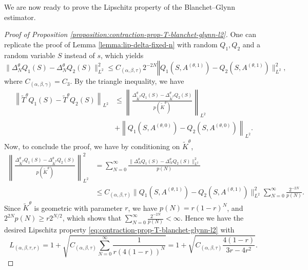 \documentclass[11pt]{article}
\numberwithin{equation}{section}
\theoremstyle{definition}
\theoremstyle{remark}
\begin{document}
We are now ready to prove the Lipschitz property of the Blanchet--Glynn estimator.

\begin{proof}[Proof of Proposition \ref{proposition:contraction-prop-T-blanchet-glynn-l2}]
   One can replicate the proof of Lemma \ref{lemma:lip-delta-fixed-n} with random $Q_1,Q_2$ and a random variable $S$ instead of $s$, which yields
    \[
        \| \Delta_N^\theta Q_1(S) - \Delta_N ^\theta Q_2(S) \|^2_{L^2} \leq C_{(\alpha, \beta, \tau)} 2^{-2N}\mathbb \|Q_1(S,A^{(\theta, 1)}) - Q_2(S, A^{(\theta, 1)})\|_{L^2}^2,
    \]
    where $C_{(\alpha,\beta,\gamma)} = C_3$.
    By the triangle inequality, we have
    \[
        \begin{aligned}
            \left\|\tilde{T}^\theta Q_1(S) - \tilde{T}^\theta Q_2(S) \right\|_{L^2} & \leq \left\|\frac{\Delta_{\tilde K^\theta}^\theta Q_1(S) - \Delta_{\tilde K ^ \theta} ^\theta Q_2(S)}{p(\tilde{K}^\theta)} \right\|_{L^2}   \\
            &+ \left\| Q_1(S,A^{(\theta, 0)}) - Q_2(S,A^{(\theta, 0)}) \right\|_{L^2}.
        \end{aligned}
    \]
    Now, to conclude the proof, we have by conditioning on $\tilde K^\theta$,
    \[
        \begin{aligned}
            \left\|\frac{\Delta_{\tilde K^\theta}^\theta Q_1(S) - \Delta_{\tilde K ^ \theta} ^\theta Q_2(S)}{p(\tilde{K}^\theta)} \right\|^2_{L^2} & = \sum_{N = 0}^{\infty} \frac{\| \Delta_N^\theta Q_1(S) - \Delta_N ^\theta Q_2(S) \|^2_{L^2}}{p(N)}                                   \\
            & \leq C_{(\alpha, \beta, \tau)} \|Q_1(S,A^{(\theta,1)}) - Q_2(S,A^{(\theta, 1)}) \|^2_{L^2} \sum_{N = 0}^{\infty} \frac{2^{-2N}}{p(N)}.
        \end{aligned}
    \]
    Since $\tilde K ^\theta$ is geometric with parameter $r$, we have
    $p(N) = r (1 - r)^{N}$, 
    and $2^{2N}p(N) \geq r 2^{N / 2}$, which shows that $\sum_{N = 0}^\infty \frac{2^{-2N}}{p(N)} < \infty$. Hence we have the desired Lipschitz property \eqref{eq:contraction-prop-T-blanchet-glynn-l2} with
    \begin{equation}
        \label{eq:lipschitz-constant-c4}
        L_{ (\alpha, \beta, \tau, r)} = 1 + \sqrt{C_{(\alpha, \beta, \tau)} \sum_{N = 0}^\infty \frac{1}{r(4(1-r))^N}} = 1 + \sqrt{C_{(\alpha, \beta, \tau)} \frac{4(1-r)}{3r - 4r^2}}.
    \end{equation}
\end{proof}
\end{document}
